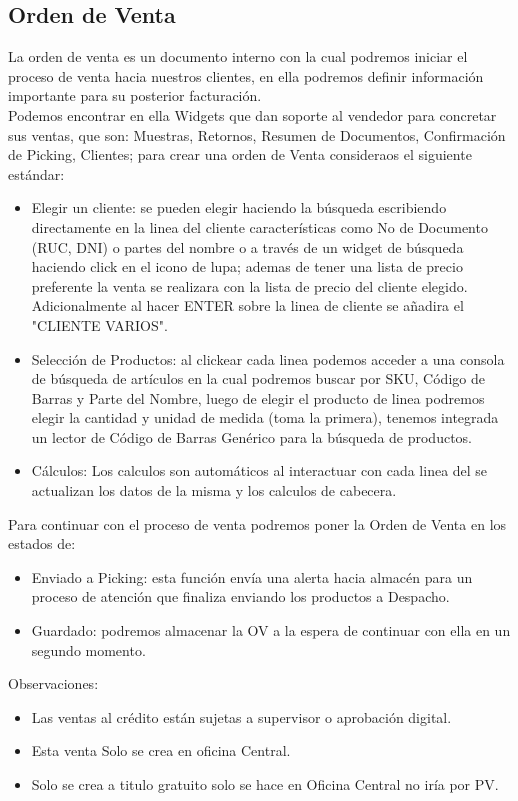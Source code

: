 \documentclass[pdftex,12pt,oneside,a4paper,spanish, english, brazil]{abntex2}
\begin{document}
\begin{sloppypar}
              \subsection{Orden de Venta}
             La orden de venta es un documento interno con la cual podremos iniciar el proceso de venta hacia nuestros clientes, en ella podremos definir información importante para su posterior facturación.\\
             Podemos encontrar en ella Widgets que dan soporte al vendedor para concretar sus ventas, que son: Muestras, Retornos, Resumen de Documentos, Confirmación de Picking, Clientes; para crear una orden de Venta consideraos el siguiente estándar:
             \begin{itemize}
              \item Elegir un cliente: se pueden elegir haciendo la búsqueda escribiendo directamente en la linea del cliente características como No de Documento (RUC, DNI) o partes del nombre o a través de un widget de búsqueda haciendo click en el icono de lupa; ademas de tener una lista de precio preferente la venta se realizara con la lista de precio del cliente elegido.\\
             Adicionalmente al hacer ENTER sobre la linea de cliente
             se añadira el "CLIENTE VARIOS".
             \item Selección de Productos: al clickear cada linea podemos acceder a una consola de búsqueda de artículos en la cual podremos buscar por SKU, Código de Barras y Parte del Nombre, luego de elegir el producto de linea podremos elegir la cantidad y unidad de medida (toma la primera), tenemos integrada un lector de Código de Barras Genérico para la búsqueda de productos.
             \item Cálculos: Los calculos son automáticos al interactuar con cada linea del se actualizan los datos de la misma y los calculos de cabecera.
             \end{itemize}
              Para continuar con el proceso de venta podremos poner la Orden de Venta en los estados de:
              \begin{itemize}
              	\item Enviado a Picking: esta función envía una alerta hacia almacén para un proceso de atención que finaliza enviando los productos a Despacho.
              	\item Guardado: podremos almacenar la OV a la espera de continuar con ella en un segundo momento.
              \end{itemize}
              Observaciones:
              \begin{itemize}
              	\item Las ventas al crédito están sujetas a supervisor o aprobación digital.
              	\item Esta venta Solo se crea en oficina Central.
              	\item Solo se crea a titulo gratuito solo se hace en Oficina Central no iría por PV.
              \end{itemize}

\end{sloppypar}
\end{document}

